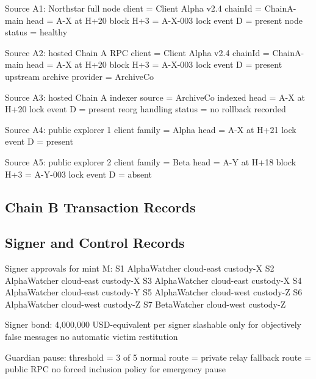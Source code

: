 \begin{codeblock}
Source A1: Northstar full node
    client = Client Alpha v2.4
    chainId = ChainA-main
    head = A-X at H+20
    block H+3 = A-X-003
    lock event D = present
    node status = healthy

Source A2: hosted Chain A RPC
    client = Client Alpha v2.4
    chainId = ChainA-main
    head = A-X at H+20
    block H+3 = A-X-003
    lock event D = present
    upstream archive provider = ArchiveCo

Source A3: hosted Chain A indexer
    source = ArchiveCo
    indexed head = A-X at H+20
    lock event D = present
    reorg handling status = no rollback recorded

Source A4: public explorer 1
    client family = Alpha
    head = A-X at H+21
    lock event D = present

Source A5: public explorer 2
    client family = Beta
    head = A-Y at H+18
    block H+3 = A-Y-003
    lock event D = absent
\end{codeblock}

\subsection*{Chain B Transaction Records}


\subsection*{Signer and Control Records}

\begin{codeblock}
Signer approvals for mint M:
    S1 AlphaWatcher cloud-east custody-X
    S2 AlphaWatcher cloud-east custody-X
    S3 AlphaWatcher cloud-east custody-X
    S4 AlphaWatcher cloud-east custody-Y
    S5 AlphaWatcher cloud-west custody-Z
    S6 AlphaWatcher cloud-west custody-Z
    S7 BetaWatcher cloud-west custody-Z

Signer bond:
    4,000,000 USD-equivalent per signer
    slashable only for objectively false messages
    no automatic victim restitution

Guardian pause:
    threshold = 3 of 5
    normal route = private relay
    fallback route = public RPC
    no forced inclusion policy for emergency pause
\end{codeblock}


